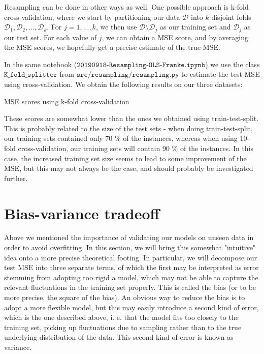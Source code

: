 \documentclass{article}
\begin{document}
Resampling can be done in other ways as well. One possible approach is k-fold cross-validation, where we start by partitioning our data ${\mathcal{D}}$ into $k$ disjoint folds ${\mathcal{D}}_1, {\mathcal{D}}_2, ..., {\mathcal{D}}_k$. For $j=1, ..., k$, we then use ${\mathcal{D}}\setminus{\mathcal{D}}_j$ as our training set and ${\mathcal{D}}_j$ as our test set. For each value of $j$, we can obtain a MSE score, and by averaging the MSE scores, we hopefully get a precise estimate of the true MSE.

In the same notebook ($\texttt{20190918-Resampling-OLS-Franke.ipynb}$) we use the class $\texttt{K\_fold\_splitter}$ from $\texttt{src/resampling/resampling.py}$ to estimate the test MSE using cross-validation. We obtain the following results on our three datasets:

\begin{table}[h!]
    \caption{MSE scores using k-fold cross-validation}
\end{table}

These scores are somewhat lower than the ones we obtained using train-test-split. This is probably related to the size of the test sets - when doing train-test-split, our training sets contained only 70 \% of the instances, whereas when using 10-fold cross-validation, our training sets will contain 90 \% of the instances. In this case, the increased training set size seems to lead to some improvement of the MSE, but this may not always be the case, and should probably be investigated further.

\section{Bias-variance tradeoff}
Above we mentioned the importance of validating our models on unseen data in order to avoid overfitting. In this section, we will bring this somewhat "intuitive" idea onto a more precise theoretical footing. In particular, we will decompose our test MSE into three separate terms, of which the first may be interpreted as error stemming from adopting too rigid a model, which may not be able to capture the relevant fluctuations in the training set properly. This is called the bias (or to be more precise, the square of the bias). An obvious way to reduce the bias is to adopt a more flexible model, but this may easily introduce a second kind of error, which is the one described above, i. e. that the model fits too closely to the training set, picking up fluctuations due to sampling rather than to the true underlying distribution of the data. This second kind of error is known as variance.
\end{document}
